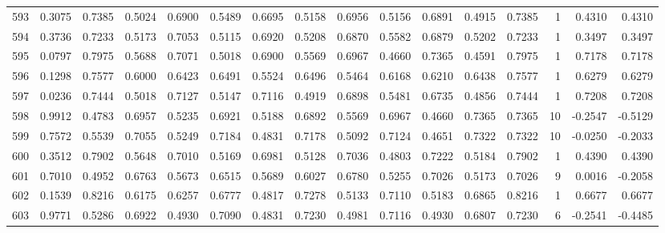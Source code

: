 \begin{tabular}{lrrrrrrrrrrrrrrr}
593 &      0.3075 &  0.7385 &  0.5024 &  0.6900 &  0.5489 &  0.6695 &  0.5158 &  0.6956 &  0.5156 &  0.6891 &   0.4915 &     0.7385 &      1 &                    0.4310 &                     0.4310 \\
594 &      0.3736 &  0.7233 &  0.5173 &  0.7053 &  0.5115 &  0.6920 &  0.5208 &  0.6870 &  0.5582 &  0.6879 &   0.5202 &     0.7233 &      1 &                    0.3497 &                     0.3497 \\
595 &      0.0797 &  0.7975 &  0.5688 &  0.7071 &  0.5018 &  0.6900 &  0.5569 &  0.6967 &  0.4660 &  0.7365 &   0.4591 &     0.7975 &      1 &                    0.7178 &                     0.7178 \\
596 &      0.1298 &  0.7577 &  0.6000 &  0.6423 &  0.6491 &  0.5524 &  0.6496 &  0.5464 &  0.6168 &  0.6210 &   0.6438 &     0.7577 &      1 &                    0.6279 &                     0.6279 \\
597 &      0.0236 &  0.7444 &  0.5018 &  0.7127 &  0.5147 &  0.7116 &  0.4919 &  0.6898 &  0.5481 &  0.6735 &   0.4856 &     0.7444 &      1 &                    0.7208 &                     0.7208 \\
598 &      0.9912 &  0.4783 &  0.6957 &  0.5235 &  0.6921 &  0.5188 &  0.6892 &  0.5569 &  0.6967 &  0.4660 &   0.7365 &     0.7365 &     10 &                   -0.2547 &                    -0.5129 \\
599 &      0.7572 &  0.5539 &  0.7055 &  0.5249 &  0.7184 &  0.4831 &  0.7178 &  0.5092 &  0.7124 &  0.4651 &   0.7322 &     0.7322 &     10 &                   -0.0250 &                    -0.2033 \\
600 &      0.3512 &  0.7902 &  0.5648 &  0.7010 &  0.5169 &  0.6981 &  0.5128 &  0.7036 &  0.4803 &  0.7222 &   0.5184 &     0.7902 &      1 &                    0.4390 &                     0.4390 \\
601 &      0.7010 &  0.4952 &  0.6763 &  0.5673 &  0.6515 &  0.5689 &  0.6027 &  0.6780 &  0.5255 &  0.7026 &   0.5173 &     0.7026 &      9 &                    0.0016 &                    -0.2058 \\
602 &      0.1539 &  0.8216 &  0.6175 &  0.6257 &  0.6777 &  0.4817 &  0.7278 &  0.5133 &  0.7110 &  0.5183 &   0.6865 &     0.8216 &      1 &                    0.6677 &                     0.6677 \\
603 &      0.9771 &  0.5286 &  0.6922 &  0.4930 &  0.7090 &  0.4831 &  0.7230 &  0.4981 &  0.7116 &  0.4930 &   0.6807 &     0.7230 &      6 &                   -0.2541 &                    -0.4485 \\

\end{tabular}

